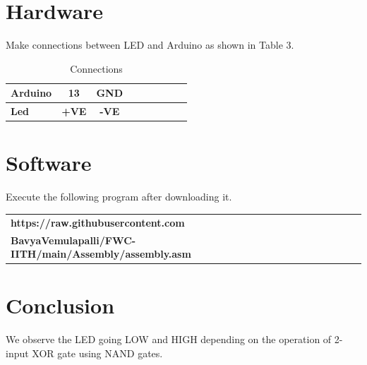 \documentclass[10pt, a4paper]{article}
\begin{document}
\section{Hardware}

Make connections between LED and Arduino as shown in Table 3.

\begin{table}[H]
 \begin{center}
    \begin{tabular}{|l|c|c|c|c|c|c|c|c} \hline\textbf{Arduino} & \textbf{13} & \textbf{GND} \\ \hline
 \textbf{Led} & \textbf{+VE} & \textbf{-VE}\\ \hline
\end{tabular}   
\end{center}
\caption{Connections}
\label{table 3}
\end{table}


\section{Software}

Execute the following program after downloading it.

\begin{table}[H]
 \begin{center}
    \begin{tabular}{|l|c|c|c|c|c|c|c|c}\hline\textbf{https://raw.githubusercontent.com}\\
    \textbf{BavyaVemulapalli/FWC-IITH/main/Assembly/assembly.asm} \\ \hline
\end{tabular}   
\end{center}
\end{table}


\section{Conclusion}
We observe the LED going LOW and HIGH depending on the operation of 2-input XOR gate using NAND gates.
\end{document}
